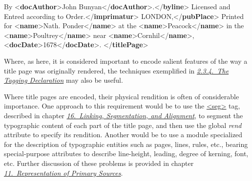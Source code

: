 \begin{shaded}
\hspace*{1em}\mbox{}\newline 
{}\mbox{}\newline 
{}By {<\textbf{docAuthor}>}John Bunyan{</\textbf{docAuthor}>}.{</\textbf{byline}>}\mbox{}\newline 
{}Licensed and Entred according to Order.{</\textbf{imprimatur}>}\mbox{}\newline 
{}\mbox{}\newline 
\hspace*{1em}LONDON,{</\textbf{pubPlace}>}\mbox{}\newline 
\hspace*{1em}\hspace*{1em} Printed for {<\textbf{name}>}Nath. Ponder{</\textbf{name}>}\mbox{}\newline 
\hspace*{1em}at the {<\textbf{name}>}Peacock{</\textbf{name}>} in the {<\textbf{name}>}Poultrey{</\textbf{name}>}\mbox{}\newline 
\hspace*{1em}near {<\textbf{name}>}Cornhil{</\textbf{name}>}, {<\textbf{docDate}>}1678{</\textbf{docDate}>}.\mbox{}\newline 
{}\mbox{}\newline 
{</\textbf{titlePage}>}\end{shaded}\egroup\par \par
Where, as here, it is considered important to encode salient features of the way a title page was originally rendered, the techniques exemplified in \textit{\hyperref[HD57]{2.3.4.\ The Tagging Declaration}} may also be useful.\par
Where title pages are encoded, their physical rendition is often of considerable importance. One approach to this requirement would be to use the \hyperref[TEI.seg]{<seg>} tag, described in chapter \textit{\hyperref[SA]{16.\ Linking, Segmentation, and Alignment}}, to segment the typographic content of each part of the title page, and then use the global {\itshape rend} attribute to specify its rendition. Another would be to use a module specialized for the description of typographic entities such as pages, lines, rules, etc., bearing special-purpose attributes to describe line-height, leading, degree of kerning, font, etc. Further discussion of these problems is provided in chapter \textit{\hyperref[PH]{11.\ Representation of Primary Sources}}.

